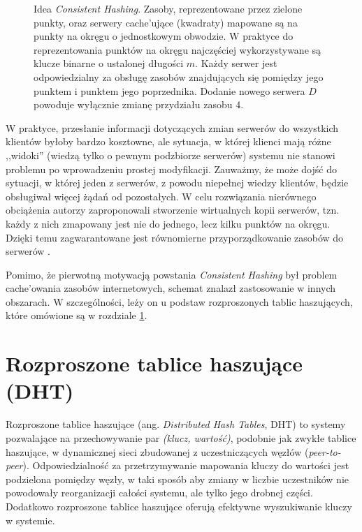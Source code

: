 \documentclass[a4paper,11pt]{scrartcl}
\newcommand{\s}{ }
\newcommand{\keszujace}{cache'ujące}
\newcommand{\keszowania}{cache'owania}
\begin{document}
\begin{figure}[ht]
\begin{minipage}[b]{0.47\linewidth}
\end{minipage}
\caption{Idea \textit{Consistent Hashing}. Zasoby, reprezentowane przez zielone punkty, oraz serwery \keszujace\s (kwadraty) mapowane są na punkty na okręgu o jednostkowym obwodzie. W praktyce do reprezentowania punktów na okręgu najczęściej wykorzystywane są klucze binarne o ustalonej długości $m$. Każdy serwer jest odpowiedzialny za obsługę zasobów znajdujących się pomiędzy jego punktem i punktem jego poprzednika. Dodanie nowego serwera $D$ powoduje wyłącznie zmianę przydziału zasobu $4$.}
\label{fig_consistent_hashing}
\end{figure}

W praktyce, przesłanie informacji dotyczących zmian serwerów do wszystkich klientów byłoby bardzo kosztowne, ale sytuacja, w której klienci mają różne ,,widoki'' (wiedzą tylko o pewnym podzbiorze serwerów) systemu nie stanowi problemu po wprowadzeniu prostej modyfikacji. Zauważmy, że może dojść do sytuacji, w której jeden z serwerów, z powodu niepełnej wiedzy klientów, będzie obsługiwał więcej żądań od pozostałych. W celu rozwiązania nierównego obciążenia autorzy zaproponowali stworzenie wirtualnych kopii serwerów, tzn. każdy z nich zmapowany jest nie do jednego, lecz kilku punktów na okręgu. Dzięki temu zagwarantowane jest równomierne przyporządkowanie zasobów do serwerów \cite{karger1999web}.

Pomimo, że pierwotną motywacją powstania \textit{Consistent Hashing} był problem \keszowania\s zasobów internetowych, schemat znalazł zastosowanie w innych obszarach. W szczególności, leży on u podstaw rozproszonych tablic haszujących, które omówione są w rozdziale \ref{sect_dht}.

\section{Rozproszone tablice haszujące (DHT)}
\label{sect_dht}
Rozproszone tablice haszujące (ang. \textit{Distributed Hash Tables}, DHT) to systemy pozwalające na przechowywanie par \textit{(klucz, wartość)}, podobnie jak zwykłe tablice haszujące, w dynamicznej sieci zbudowanej z uczestniczących węzłów (\textit{peer-to-peer}). Odpowiedzialność za przetrzymywanie mapowania kluczy do wartości jest podzielona pomiędzy węzły, w taki sposób aby zmiany w liczbie uczestników nie powodowały reorganizacji całości systemu, ale tylko jego drobnej części. Dodatkowo rozproszone tablice haszujące oferują efektywne wyszukiwanie kluczy w systemie.
\end{document}

